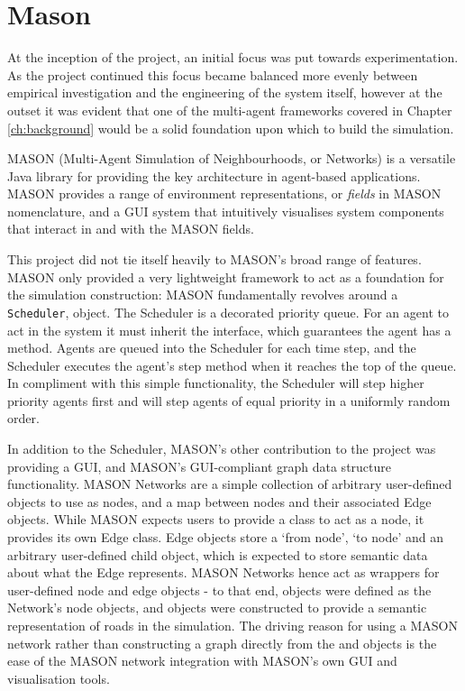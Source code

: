 \section{Mason}

At the inception of the project, an initial focus was put towards experimentation. As the project continued this focus became balanced more evenly between empirical investigation and the engineering of the system itself, however at the outset it was evident that one of the multi-agent frameworks covered in Chapter \ref{ch:background} would be a solid foundation upon which to build the simulation.

MASON (Multi-Agent Simulation of Neighbourhoods, or Networks) is a versatile Java library for providing the key architecture in agent-based applications. MASON provides a range of environment representations, or \textit{fields} in MASON nomenclature, and a GUI system that intuitively visualises system components that interact in and with the MASON fields.

This project did not tie itself heavily to MASON's broad range of features. MASON only provided a very lightweight framework to act as a foundation for the simulation construction: MASON fundamentally revolves around a \texttt{Scheduler}, object. The Scheduler is a decorated priority queue. For an agent to act in the system it must inherit the  interface, which guarantees the agent has a  method. Agents are queued into the Scheduler for each time step, and the Scheduler executes the agent's step method when it reaches the top of the queue. In compliment with this simple functionality, the Scheduler will step higher priority agents first and will step agents of equal priority in a uniformly random order.

In addition to the Scheduler, MASON's other contribution to the project was providing a GUI, and MASON's GUI-compliant graph data structure functionality. MASON Networks are a simple collection of arbitrary user-defined objects to use as nodes, and a map between nodes and their associated Edge objects. While MASON expects users to provide a class to act as a node, it provides its own Edge class. Edge objects store a `from node', `to node' and an arbitrary user-defined child object, which is expected to store semantic data about what the Edge represents. MASON Networks hence act as wrappers for user-defined node and edge objects - to that end,  objects were defined as the Network's node objects, and  objects were constructed to provide a semantic representation of roads in the simulation. The driving reason for using a MASON network rather than constructing a graph directly from the  and  objects is the ease of the MASON network integration with MASON's own GUI and visualisation tools.


